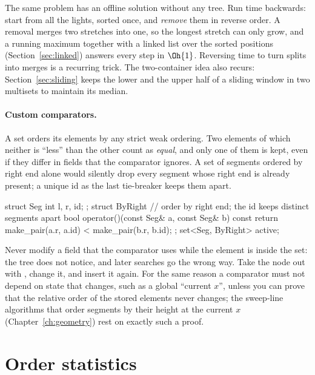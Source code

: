 The same problem has an offline solution without any tree. Run time backwards: start from all the lights, sorted once, and
\emph{remove} them in reverse order. A removal merges two stretches into one, so the longest stretch can only grow, and a running
maximum together with a linked list over the sorted positions (Section~\ref{sec:linked}) answers every step in $\Oh{1}$. Reversing
time to turn splits into merges is a recurring trick. The two-container idea also recurs: Section~\ref{sec:sliding} keeps the lower
and the upper half of a sliding window in two multisets to maintain its median.

\paragraph{Custom comparators.} A set orders its elements by any strict weak ordering. Two elements of which neither is ``less'' than
the other count as \emph{equal}, and only one of them is kept, even if they differ in fields that the comparator ignores. A set of
segments ordered by right end alone would silently drop every segment whose right end is already present; a unique id as the last
tie-breaker keeps them apart.

\begin{code}
struct Seg {
    int l, r, id;
};
struct ByRight {  // order by right end; the id keeps distinct segments apart
    bool operator()(const Seg& a, const Seg& b) const {
        return make_pair(a.r, a.id) < make_pair(b.r, b.id);
    }
};
set<Seg, ByRight> active;
\end{code}

\begin{pitfall}
Never modify a field that the comparator uses while the element is inside the set: the tree does not notice, and later searches go
the wrong way. Take the node out with , change it, and insert it again. For the same reason a comparator must not depend
on state that changes, such as a global ``current $x$'', unless you can prove that the relative order of the stored elements never
changes; the sweep-line algorithms that order segments by their height at the current $x$ (Chapter~\ref{ch:geometry}) rest on
exactly such a proof.
\end{pitfall}

\section[Order statistics]{Order statistics \hfill \gold}\label{sec:orderstats}

